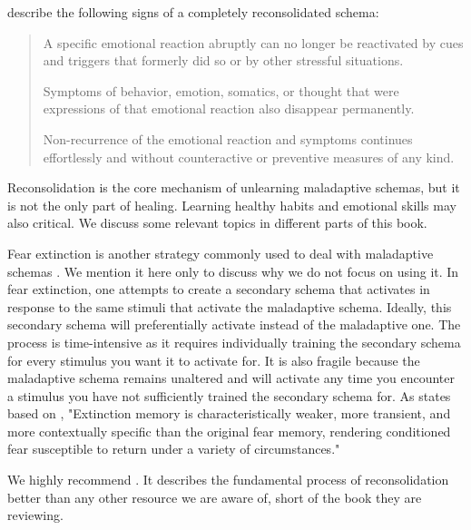 \documentclass[12pt,letterpaper]{book}
\begin{document}
\textcite{eckerUnlocking} describe the following signs of a completely reconsolidated schema:
\begin{quotation}
    A specific emotional reaction abruptly can no longer be reactivated by cues and triggers that formerly did so or by other stressful situations.
    
    Symptoms of behavior, emotion, somatics, or thought that were expressions of that emotional reaction also disappear permanently.
    
    Non-recurrence of the emotional reaction and symptoms continues effortlessly and without counteractive or preventive measures of any kind.
\end{quotation}

Reconsolidation is the core mechanism of unlearning maladaptive schemas, but it is not the only part of healing. Learning healthy habits and emotional skills may also critical. We discuss some relevant topics in different parts of this book.

Fear extinction is another strategy commonly used to deal with maladaptive schemas \cite{eckerUnlocking}. We mention it here only to discuss why we do not focus on using it. In fear extinction, one attempts to create a secondary schema that activates in response to the same stimuli that activate the maladaptive schema. Ideally, this secondary schema will preferentially activate instead of the maladaptive one. The process is time-intensive as it requires individually training the secondary schema for every stimulus you want it to activate for. It is also fragile because the maladaptive schema remains unaltered and will activate any time you encounter a stimulus you have not sufficiently trained the secondary schema for. As \textcite{doss2024memory} states based on \textcite{dunsmoor2022laboratory}, "Extinction memory is characteristically weaker, more transient, and more contextually specific than the original fear memory, rendering conditioned fear susceptible to return under a variety of circumstances."

We highly recommend \textcite{lesswrongCoherenceTherapy}. It describes the fundamental process of reconsolidation better than any other resource we are aware of, short of the book they are reviewing.
\end{document}
